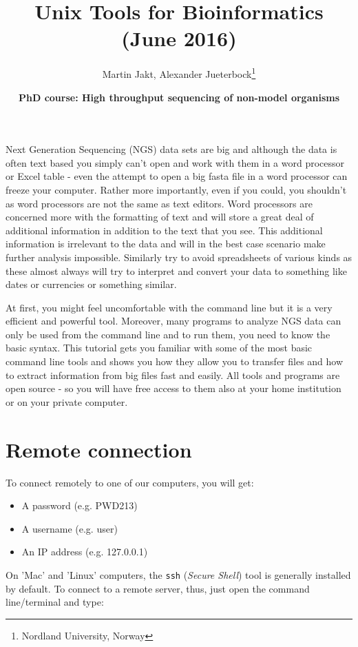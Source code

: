\documentclass[11pt]{article}
\author{Martin Jakt, Alexander Jueterbock\thanks{Nordland University, Norway}}
\date{\textbf{PhD course: High throughput sequencing of non-model organisms}}
\title{\textbf{Unix Tools for Bioinformatics} (June 2016)}
\begin{document}
\maketitle
\tableofcontents

Next Generation Sequencing (NGS) data sets are big and although the data is
often text based you
simply can't open and work with them in a word processor or Excel
table - even the attempt to open a big fasta file in a word processor can
freeze your computer. Rather more importantly, even if you could, you
shouldn't as word processors are not the same as text editors. Word
processors are concerned more with the formatting of text and will store a
great deal of additional information in addition to the text that you
see. This additional information is irrelevant to the data and will in the
best case scenario make further analysis impossible. Similarly try to avoid
spreadsheets of various kinds as these almost always will try to interpret
and convert your data to something like dates or currencies or something similar.

At first, you might feel uncomfortable with the
command line but it is a very efficient and powerful tool. Moreover,
many programs to analyze NGS data can only be used from the command line and to
run them, you need to know the basic syntax. This tutorial gets you
familiar with some of the most basic command line tools and shows
you how they allow you to transfer files and how to extract
information from big files fast and easily. All tools and programs are
open source - so you will have free access to them also at your home
institution or on your private computer.


\section{Remote connection}
\label{sec:orgheadline1}
To connect remotely to one of our computers, you will get:

\begin{itemize}
\item A password (e.g. PWD213)
\item A username (e.g. user)
\item An IP address (e.g. 127.0.0.1)
\end{itemize}

On 'Mac' and 'Linux' computers, the \texttt{ssh} (\emph{Secure Shell}) tool is
generally installed by default. To connect to a remote server, thus,
just open the command line/terminal and type:
\end{document}
